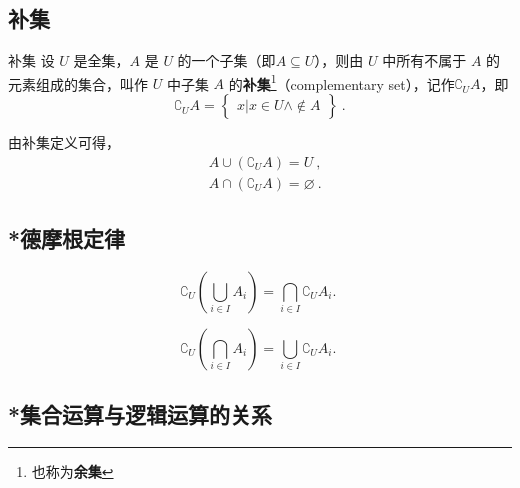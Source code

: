 \subsection{补集}
\begin{definition}{补集}
设 $U$ 是全集，$A$ 是 $U$ 的一个子集（即$A\subseteq U$），则由 $U$ 中所有不属于 $A$ 的元素组成的集合，叫作 $U$ 中子集 $A$ 的\textbf{补集}\footnote{也称为\textbf{余集}}（complementary set），记作$\complement_UA$，即
\begin{equation}
\complement_UA = \begin{Bmatrix}x|x\in U \wedge \notin A\end{Bmatrix}~.
\end{equation}
\end{definition}

由补集定义可得，
\begin{equation}
\begin{aligned}
&A\cup (\complement_UA) = U~, \\
&A\cap (\complement_UA) = \varnothing~.
\end{aligned}
\end{equation}
\subsection{*德摩根定律}


\begin{equation}
\complement_U(\bigcup_{i\in I} A_i)=\bigcap_{i\in I} \complement_UA_i.~
\end{equation}

\begin{equation}
\complement_U(\bigcap_{i\in I} A_i)=\bigcup_{i\in I} {\complement_UA_i}.~
\end{equation}


\subsection{*集合运算与逻辑运算的关系}
